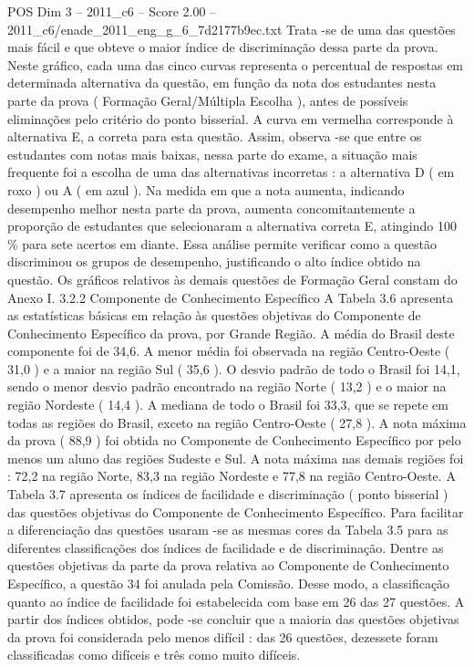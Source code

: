\begin{textsample}{POS Dim 3 – 2011\_c6 – Score 2.00 – 2011\_c6/enade\_2011\_eng\_g\_6\_7d2177b9ec.txt}
Trata -se de uma das questões mais fácil e que obteve o maior índice de discriminação dessa parte da prova.
Neste gráfico, cada uma das cinco curvas representa o percentual de respostas em determinada alternativa da questão, em função da nota dos estudantes nesta parte da prova ( Formação Geral/Múltipla Escolha ), antes de possíveis eliminações pelo critério do ponto bisserial.
A curva em vermelha corresponde à alternativa E, a correta para esta questão.
Assim, observa -se que entre os estudantes com notas mais baixas, nessa parte do exame, a situação mais frequente foi a escolha de uma das alternativas incorretas : a alternativa D ( em roxo ) ou A ( em azul ).
Na medida em que a nota aumenta, indicando desempenho melhor nesta parte da prova, aumenta concomitantemente a proporção de estudantes que selecionaram a alternativa correta E, atingindo 100 \% para sete acertos em diante.
Essa análise permite verificar como a questão discriminou os grupos de desempenho, justificando o alto índice obtido na questão.
Os gráficos relativos às demais questões de Formação Geral constam do Anexo I. 3.2.2 Componente de Conhecimento Específico A Tabela 3.6 apresenta as estatísticas básicas em relação às questões objetivas do Componente de Conhecimento Específico da prova, por Grande Região.
A média do Brasil deste componente foi de 34,6.
A menor média foi observada na região Centro-Oeste ( 31,0 ) e a maior na região Sul ( 35,6 ).
O desvio padrão de todo o Brasil foi 14,1, sendo o menor desvio padrão encontrado na região Norte ( 13,2 ) e o maior na região Nordeste ( 14,4 ).
A mediana de todo o Brasil foi 33,3, que se repete em todas as regiões do Brasil, exceto na região Centro-Oeste ( 27,8 ).
A nota máxima da prova ( 88,9 ) foi obtida no Componente de Conhecimento Específico por pelo menos um aluno das regiões Sudeste e Sul.
A nota máxima nas demais regiões foi : 72,2 na região Norte, 83,3 na região Nordeste e 77,8 na região Centro-Oeste.
A Tabela 3.7 apresenta os índices de facilidade e discriminação ( ponto bisserial ) das questões objetivas do Componente de Conhecimento Específico.
Para facilitar a diferenciação das questões usaram -se as mesmas cores da Tabela 3.5 para as diferentes classificações dos índices de facilidade e de discriminação.
Dentre as questões objetivas da parte da prova relativa ao Componente de Conhecimento Específico, a questão 34 foi anulada pela Comissão.
Desse modo, a classificação quanto ao índice de facilidade foi estabelecida com base em 26 das 27 questões.
A partir dos índices obtidos, pode -se concluir que a maioria das questões objetivas da prova foi considerada pelo menos difícil : das 26 questões, dezessete foram classificadas como difíceis e três como muito difíceis.

\end{textsample}
